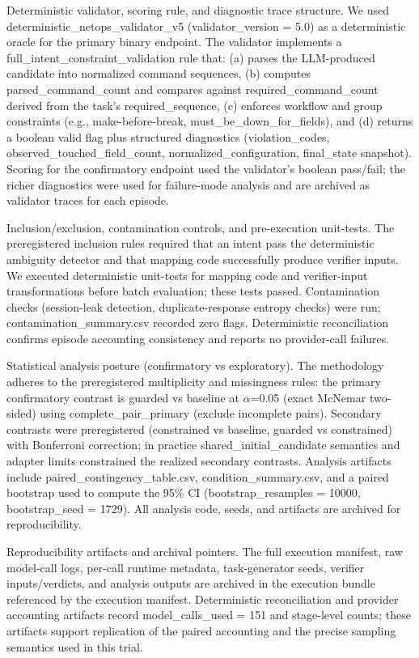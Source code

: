 \documentclass[conference]{IEEEtran}
\begin{document}
Deterministic validator, scoring rule, and diagnostic trace structure. We used deterministic\_netops\_validator\_v5 (validator\_version = 5.0) as a deterministic oracle for the primary binary endpoint. The validator implements a full\_intent\_constraint\_validation rule that: (a) parses the LLM-produced candidate into normalized command sequences, (b) computes parsed\_command\_count and compares against required\_command\_count derived from the task's required\_sequence, (c) enforces workflow and group constraints (e.g., make-before-break, must\_be\_down\_for\_fields), and (d) returns a boolean valid flag plus structured diagnostics (violation\_codes, observed\_touched\_field\_count, normalized\_configuration, final\_state snapshot). Scoring for the confirmatory endpoint used the validator's boolean pass/fail; the richer diagnostics were used for failure-mode analysis and are archived as validator traces for each episode.

Inclusion/exclusion, contamination controls, and pre-execution unit-tests. The preregistered inclusion rules required that an intent pass the deterministic ambiguity detector and that mapping code successfully produce verifier inputs. We executed deterministic unit-tests for mapping code and verifier-input transformations before batch evaluation; these tests passed. Contamination checks (session-leak detection, duplicate-response entropy checks) were run; contamination\_summary.csv recorded zero flags. Deterministic reconciliation confirms episode accounting consistency and reports no provider-call failures.

Statistical analysis posture (confirmatory vs exploratory). The methodology adheres to the preregistered multiplicity and missingness rules: the primary confirmatory contrast is guarded vs baseline at \ensuremath{\alpha}=0.05 (exact McNemar two-sided) using complete\_pair\_primary (exclude incomplete pairs). Secondary contrasts were preregistered (constrained vs baseline, guarded vs constrained) with Bonferroni correction; in practice shared\_initial\_candidate semantics and adapter limits constrained the realized secondary contrasts. Analysis artifacts include paired\_contingency\_table.csv, condition\_summary.csv, and a paired bootstrap used to compute the 95\% CI (bootstrap\_resamples = 10000, bootstrap\_seed = 1729). All analysis code, seeds, and artifacts are archived for reproducibility.

Reproducibility artifacts and archival pointers. The full execution manifest, raw model-call logs, per-call runtime metadata, task-generator seeds, verifier inputs/verdicts, and analysis outputs are archived in the execution bundle referenced by the execution manifest. Deterministic reconciliation and provider accounting artifacts record model\_calls\_used = 151 and stage-level counts; these artifacts support replication of the paired accounting and the precise sampling semantics used in this trial.
\end{document}
